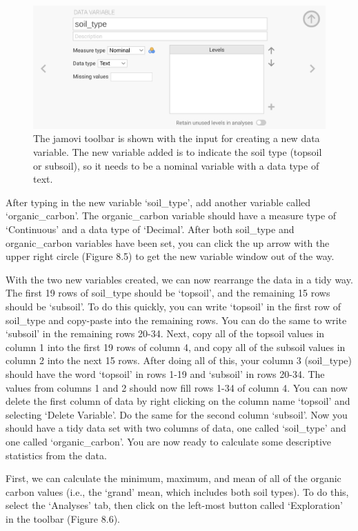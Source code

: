 \documentclass[
]{scrbook}
\begin{document}
\begin{figure}
\includegraphics[width=1\linewidth]{img/jamovi_set_variable} \caption{The jamovi toolbar is shown with the input for creating a new data variable. The new variable added is to indicate the soil type (topsoil or subsoil), so it needs to be a nominal variable with a data type of text.}\label{fig:unnamed-chunk-28}
\end{figure}

After typing in the new variable `soil\_type', add another variable called `organic\_carbon'.
The organic\_carbon variable should have a measure type of `Continuous' and a data type of `Decimal'.
After both soil\_type and organic\_carbon variables have been set, you can click the up arrow with the upper right circle (Figure 8.5) to get the new variable window out of the way.

With the two new variables created, we can now rearrange the data in a tidy way.
The first 19 rows of soil\_type should be `topsoil', and the remaining 15 rows should be `subsoil'.
To do this quickly, you can write `topsoil' in the first row of soil\_type and copy-paste into the remaining rows.
You can do the same to write `subsoil' in the remaining rows 20-34.
Next, copy all of the topsoil values in column 1 into the first 19 rows of column 4, and copy all of the subsoil values in column 2 into the next 15 rows.
After doing all of this, your column 3 (soil\_type) should have the word `topsoil' in rows 1-19 and `subsoil' in rows 20-34.
The values from columns 1 and 2 should now fill rows 1-34 of column 4.
You can now delete the first column of data by right clicking on the column name `topsoil' and selecting `Delete Variable'.
Do the same for the second column `subsoil'.
Now you should have a tidy data set with two columns of data, one called `soil\_type' and one called `organic\_carbon'.
You are now ready to calculate some descriptive statistics from the data.

First, we can calculate the minimum, maximum, and mean of all of the organic carbon values (i.e., the `grand' mean, which includes both soil types).
To do this, select the `Analyses' tab, then click on the left-most button called `Exploration' in the toolbar (Figure 8.6).
\end{document}
